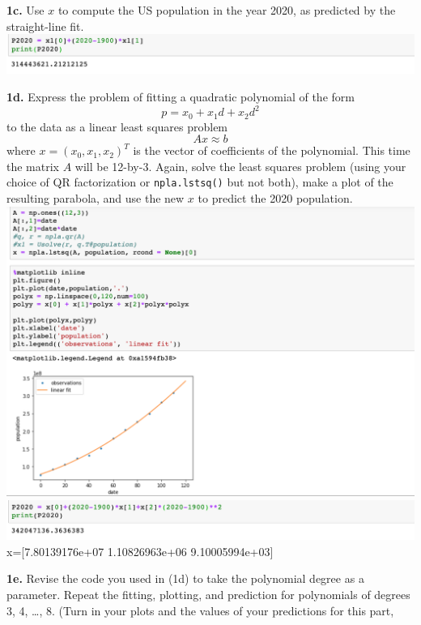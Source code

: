\documentclass[11pt]{article}
\begin{document}
\par\medskip
{\bf 1c.}
Use $x$ to compute the US population in the year 2020, 
as predicted by the straight-line fit.\\
\includegraphics[scale = 0.4]{h51c}

\par\medskip
{\bf 1d.}
Express the problem of fitting a quadratic polynomial of the form
$$ p = x_0 + x_1d + x_2d^2 $$
to the data as a linear least squares problem
$$A x \approx b$$
where $x = (x_0, x_1, x_2)^T$ is the vector of coefficients of the polynomial.
This time the matrix $A$ will be 12-by-3.
Again, solve the least squares problem 
(using your choice of QR factorization or {\tt npla.lstsq()} but not both),
make a plot of the resulting parabola, 
and use the new $x$ to predict the 2020 population.\\
\includegraphics[scale = 0.6]{h51d}\\
\includegraphics[scale = 0.6]{h51d2.png}\\
x=[7.80139176e+07   1.10826963e+06   9.10005994e+03]
\par\medskip
{\bf 1e.}
Revise the code you used in (1d) to take the polynomial degree as a parameter.
Repeat the fitting, plotting, and prediction 
for polynomials of degrees 3, 4, \ldots, 8.
(Turn in your plots and the values of your predictions for this part,
\end{document}
